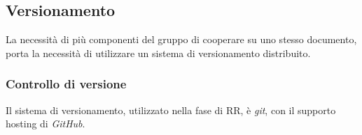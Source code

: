 

\subsection{Versionamento}\label{ProcessiSupporto_Versionamento}
La necessità di più componenti del gruppo di cooperare su uno stesso documento, porta la necessità di utilizzare un sistema di versionamento distribuito. 



\subsubsection{Controllo di versione}
Il sistema di versionamento, utilizzato nella fase di RR, è \textit{git}, con il supporto hosting di \textit{GitHub}.

